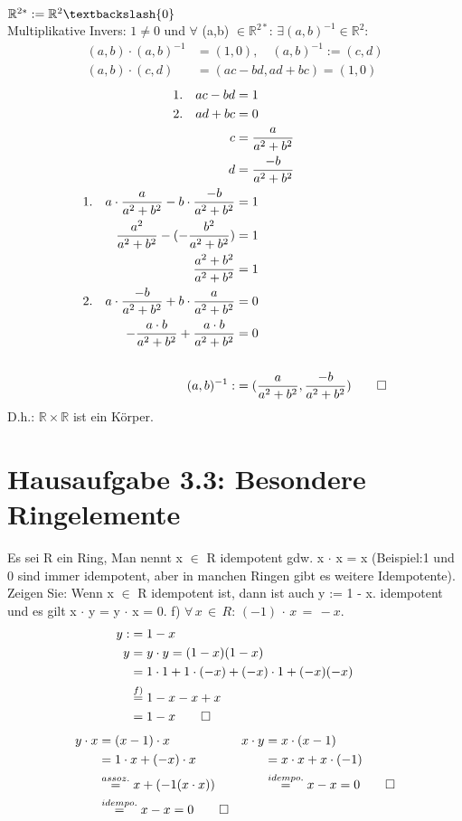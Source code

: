 \documentclass[titlepage]{article}
\begin{document}
	$\mathbb{R}^{2*}:=\mathbb{R}^2 \textbackslash \{0\}$\\
	Multiplikative Invers: $1\neq0$ und $\forall$ (a,b) $\in \mathbb{R}^{2*}$: $\exists (a,b)^{-1} \in \mathbb{R}^2:$
	\begin{align*}
		(a,b)\cdot(a,b)^{-1}&=(1,0),\quad(a,b)^{-1}:=(c,d)\\
		(a,b)\cdot(c,d) &= (ac-bd,ad+bc) = (1,0)
	\end{align*}
	\begin{align*}
		1.\quad ac-bd &=1\\
		2.\quad ad+bc &= 0 \\
		c&=\frac{a}{a^2+b^2}\\
		d&=\frac{-b}{a^2+b^2}\\
		1.\quad a\cdot \frac{a}{a^2+b^2}-b\cdot \frac{-b}{a^2+b^2} &= 1\\
		\frac{a^2}{a^2+b^2}-(-\frac{b^2}{a^2+b^2}) &= 1\\
		\frac{a^2+b^2}{a^2+b^2}&= 1\\
		2.\quad a\cdot \frac{-b}{a^2+b^2}+b\cdot \frac{a}{a^2+b^2} &= 0\\
		-\frac{a\cdot b}{a^2+b^2}+\frac{a\cdot b}{a^2+b^2} &= 0\\\\
		(a,b)^{-1}:&=(\frac{a}{a^2+b^2},\frac{-b}{a^2+b^2}) \qed
	\end{align*}
	D.h.: $\mathbb{R}\times \mathbb{R}$ ist ein Körper.
	\newpage
	\section*{Hausaufgabe 3.3: Besondere Ringelemente}
	Es sei R ein Ring, Man nennt x $\in$ R idempotent gdw. x $\cdot$ x = x (Beispiel:1 und 0 sind immer idempotent, aber in manchen Ringen gibt es weitere Idempotente). Zeigen Sie: Wenn x $\in$ R idempotent ist, dann ist auch y := 1 - x.
	idempotent und es gilt x $\cdot$ y = y $\cdot$ x = 0.
		f)  $\forall\,x\,\in\,R:\,(-1)\,\cdot\,x\,=\,-x.$
		\begin{align*}
			y:&=1-x\\
			y &= y\cdot y = (1-x)(1-x)\\
			&= 1\cdot 1+1\cdot (-x)+(-x)\cdot 1+(-x)(-x) \\
			&\overset{f)}{=}1-x-x+x\\
			&= 1-x \qed
		\end{align*}
		\begin{align*}
			y\cdot x &= (x-1)\cdot x & x\cdot y &= x\cdot (x-1)\\
			&= 1\cdot x+(-x)\cdot x & &= x\cdot x+x\cdot (-1)\\
			&\overset{assoz.}{=} x+(-1(x\cdot x)) & &\overset{idempo.}{=} x-x=0 \qed\\
			&\overset{idempo.}{=} x-x=0 \qed
		\end{align*}
\end{document}
